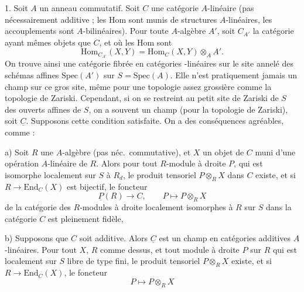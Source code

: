 \documentclass[11pt,a4paper]{article}
\begin{document}
1. Soit $A$ un anneau commutatif. Soit $C$ une catégorie $A$-linéaire (pas
nécessairement additive ; les Hom sont munis de structures $A$-linéaires,
les accouplements sont $A$-bilinéaires). Pour toute \struck{\ill{}}
$A$-algèbre $A'$, soit $C_{A'}$ la catégorie ayant mêmes objets que $C$, et
où les Hom sont
\[
  \mathrm{Hom}_{C_{A'}}(X,Y) = \mathrm{Hom}_{C}(X,Y) \otimes_{A} A' .
\]
On trouve ainsi une  catégorie fibrée
 en catégories -linéaires sur le site
annelé des schémas affines $\mathrm{Spec}(A')$ sur $S = \mathrm{Spec}(A)$.
Elle n'est pratiquement jamais un champ sur ce gros site, même pour une
topologie assez grossière comme la topologie de Zariski. Cependant, si on
se restreint au petit site  de Zariski de $S$ des ouverts
affines de $S$, on a souvent un champ (pour la topologie de Zariski), soit
$\underline{C}$. 
Supposons cette condition satisfaite. On a des conséquences agréables,
comme :

a) Soit $R$ une $A$-algèbre (pas néc.\ commutative), et $X$ un objet de
$C$ muni d'une opération $A$-linéaire de $R$. Alors pour tout $R$-module
à droite $P$, qui est isomorphe localement sur $S$ à $R_{d}$, le produit
tensoriel $P \otimes_{R} X$ dans $C$ existe, et si $R \to
\mathrm{End}_{C}(X)$ est bijectif, le foncteur
\[
  \underline{P}(R) \longrightarrow C , \qquad P \longmapsto P \otimes_{R} X
\]
de la catégorie des $R$-modules à droite localement isomorphes à $R$ sur
$S$ dans la catégorie $C$ est pleinement fidèle,

b) Supposons que $C$ soit additive. Alors $\underline{C}$ est un champ en
catégories additives $A$-linéaires. Pour tout $X$, $R$ comme dessus,
 et tout module à droite $P$ sur $R$ qui est localement sur $S$
libre de type fini, le produit tensoriel $P \otimes_{R} X$ existe, et si
$R \to \mathrm{End}_{C}(X)$, le foncteur
\[
  P \longmapsto P \otimes_{R} X
\]
\end{document}
